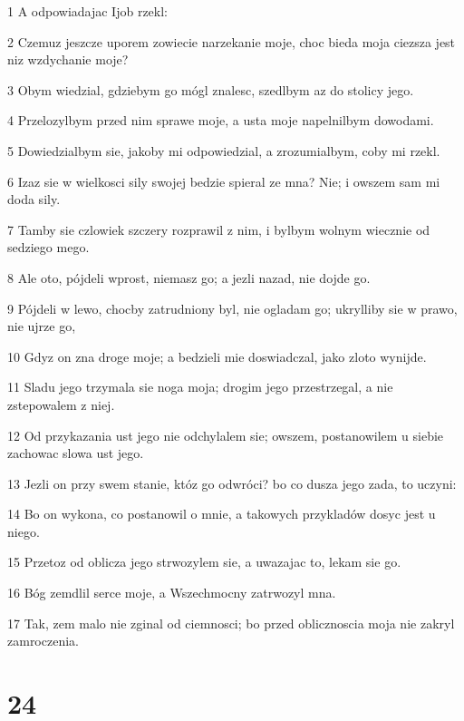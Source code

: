 \par 1 A odpowiadajac Ijob rzekl:
\par 2 Czemuz jeszcze uporem zowiecie narzekanie moje, choc bieda moja ciezsza jest niz wzdychanie moje?
\par 3 Obym wiedzial, gdziebym go mógl znalesc, szedlbym az do stolicy jego.
\par 4 Przelozylbym przed nim sprawe moje, a usta moje napelnilbym dowodami.
\par 5 Dowiedzialbym sie, jakoby mi odpowiedzial, a zrozumialbym, coby mi rzekl.
\par 6 Izaz sie w wielkosci sily swojej bedzie spieral ze mna? Nie; i owszem sam mi doda sily.
\par 7 Tamby sie czlowiek szczery rozprawil z nim, i bylbym wolnym wiecznie od sedziego mego.
\par 8 Ale oto, pójdeli wprost, niemasz go; a jezli nazad, nie dojde go.
\par 9 Pójdeli w lewo, chocby zatrudniony byl, nie ogladam go; ukrylliby sie w prawo, nie ujrze go,
\par 10 Gdyz on zna droge moje; a bedzieli mie doswiadczal, jako zloto wynijde.
\par 11 Sladu jego trzymala sie noga moja; drogim jego przestrzegal, a nie zstepowalem z niej.
\par 12 Od przykazania ust jego nie odchylalem sie; owszem, postanowilem u siebie zachowac slowa ust jego.
\par 13 Jezli on przy swem stanie, któz go odwróci? bo co dusza jego zada, to uczyni:
\par 14 Bo on wykona, co postanowil o mnie, a takowych przykladów dosyc jest u niego.
\par 15 Przetoz od oblicza jego strwozylem sie, a uwazajac to, lekam sie go.
\par 16 Bóg zemdlil serce moje, a Wszechmocny zatrwozyl mna.
\par 17 Tak, zem malo nie zginal od ciemnosci; bo przed oblicznoscia moja nie zakryl zamroczenia.

\chapter{24}

